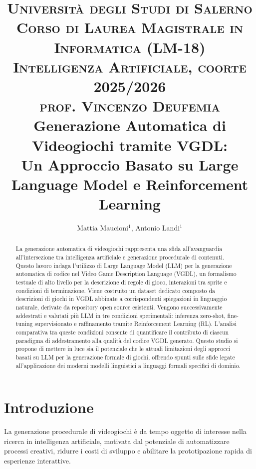\documentclass[final,5p,times,twocolumn]{elsarticle}
\begin{document}
\begin{frontmatter}

\title{%
  \small\textsc{Università degli Studi di Salerno\\
  Corso di Laurea Magistrale in Informatica (LM-18)\\
  Intelligenza Artificiale, coorte 2025/2026 \\
  prof. Vincenzo Deufemia} \\[4pt]
  \Large Generazione Automatica di Videogiochi tramite VGDL: \\
  Un Approccio Basato su Large Language Model e Reinforcement Learning
}

\author{Mattia Maucioni$^1$, Antonio Landi$^1$}

\address{$^1$Track: Data Science \& Machine Learning}

\begin{abstract}
La generazione automatica di videogiochi rappresenta una sfida all'avanguardia all'intersezione tra intelligenza artificiale e generazione procedurale di contenuti. Questo lavoro indaga l'utilizzo di Large Language Model (LLM) per la generazione automatica di codice nel Video Game Description Language (VGDL), un formalismo testuale di alto livello per la descrizione di regole di gioco, interazioni tra sprite e condizioni di terminazione. Viene costruito un dataset dedicato composto da descrizioni di giochi in VGDL abbinate a corrispondenti spiegazioni in linguaggio naturale, derivate da repository open source esistenti. Vengono successivamente addestrati e valutati più LLM in tre condizioni sperimentali: inferenza zero-shot, fine-tuning supervisionato e raffinamento tramite Reinforcement Learning (RL). L'analisi comparativa tra queste condizioni consente di quantificare il contributo di ciascun paradigma di addestramento alla qualità del codice VGDL generato. Questo studio si propone di mettere in luce sia il potenziale che le attuali limitazioni degli approcci basati su LLM per la generazione formale di giochi, offrendo spunti sulle sfide legate all'applicazione dei moderni modelli linguistici a linguaggi formali specifici di dominio.
\end{abstract}



\end{frontmatter}

\section{Introduzione}
La generazione procedurale di videogiochi è da tempo oggetto di interesse nella ricerca in intelligenza artificiale, motivata dal potenziale di automatizzare processi creativi, ridurre i costi di sviluppo e abilitare la prototipazione rapida di esperienze interattive.
\end{document}
